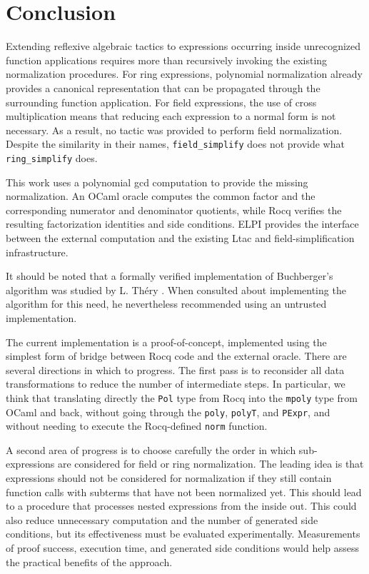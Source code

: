 \documentclass{jflart}
\begin{document}
\section{Conclusion}


Extending reflexive algebraic tactics to expressions occurring inside
unrecognized function applications requires more than recursively invoking
the existing normalization procedures. For ring expressions, polynomial
normalization already provides a canonical representation that can be
propagated through the surrounding function application. For field expressions, the use of cross multiplication means that reducing each expression to a normal form is not necessary. As a result, no tactic was
provided to perform field normalization.  Despite the similarity in their names,
\texttt{field\_simplify} does not provide what \texttt{ring\_simplify} does.

This work uses a polynomial gcd computation to provide the missing
normalization. An
OCaml oracle computes the common factor and the corresponding numerator and
denominator quotients, while Rocq verifies the resulting factorization
identities and side conditions. ELPI provides the interface between the
external computation and the existing Ltac and field-simplification
infrastructure.

It should be noted that a formally verified implementation of Buchberger's
algorithm was studied by L. Théry \cite{thery2001machine}.  When consulted
about implementing the algorithm for this need, he nevertheless recommended using an untrusted implementation.

The current implementation is a proof-of-concept, implemented using the
simplest form of bridge between Rocq code and the external oracle.  There
are several directions in which to progress.  The first pass is to
reconsider all data transformations to reduce the number of intermediate
steps.  In particular, we think that translating directly the \texttt{Pol} type from
Rocq into the \texttt{mpoly} type from OCaml and back, without going through the
\texttt{poly}, \texttt{polyT}, and \texttt{PExpr}, and without needing to execute
the Rocq-defined \texttt{norm} function.

A second area of progress is to choose carefully the order in which
sub-expressions are considered for field or ring normalization.  The leading
idea is that expressions should not be considered for normalization
if they still contain function calls with subterms that have not been
normalized yet.  This should lead to a
procedure that processes nested expressions from
the inside out. This could also reduce unnecessary computation and the
number of generated side conditions, but its effectiveness must be
evaluated experimentally. Measurements of proof success, execution
time, and generated side conditions would help assess the practical
benefits of the approach.
\end{document}
